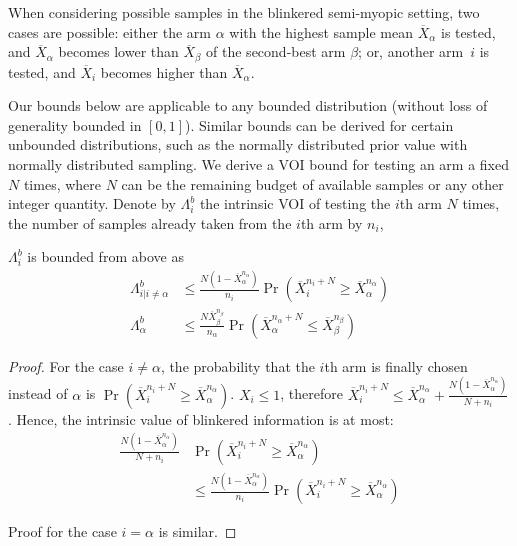 When considering possible samples in the blinkered semi-myopic setting,
two cases are possible: either
	the arm $\alpha$ with the highest sample mean $\overline
  	X_\alpha$ is tested, and $\overline X_\alpha$ becomes lower than
 	$\overline X_\beta$ of the second-best arm $\beta$;
or, 
	another arm~$i$ is tested, and $\overline X_i$ becomes higher
    than $\overline X_\alpha$.


Our bounds below are applicable to any bounded distribution (without loss of generality 
bounded in $[0,1]$). Similar
bounds can be derived for certain unbounded distributions, such as the
normally distributed prior value with normally distributed
sampling.
We derive a VOI bound for testing an arm a fixed $N$ times,
where $N$ can be the remaining budget of available samples or
any other integer quantity.
Denote by  $\Lambda_i^b$ the intrinsic VOI of testing the $i$th arm
$N$ times, the number of
samples already taken from the $i$th arm by $n_i$, 
\begin{thm} $\Lambda_i^b$ is bounded from above as
\begin{align}
\label{eqn:mcts-thm-be}
\Lambda_{i|i\ne\alpha}^b&\le \frac {N(1-\overline X_\alpha^{n_\alpha})} {n_i}\Pr(\overline   X_i^{{n_i}+N}\ge\overline X_\alpha^{n_\alpha})\nonumber\\
\Lambda_\alpha^b&\le \frac {N \overline X_\beta^{n_\beta}} {n_\alpha} \Pr(\overline X_\alpha^{n_\alpha+N}\le\overline X_\beta^{n_\beta})
\end{align}
\label{thm:mcts-be}
\end{thm}
\begin{proof} For the case $i\ne \alpha$, the probability that the
  $i$th arm is finally chosen instead of $\alpha$ is
  $\Pr(\overline X_i^{n_i+N} \ge \overline X_\alpha^{n_\alpha})$. $X_i \le 1$,
  therefore $\overline X_i^{n_i+N}\le \overline
  X_\alpha^{n_\alpha}+\frac {N(1-\overline
  X_\alpha^{n_\alpha})} {N+n_i}$. Hence, the intrinsic value of blinkered
  information is at most: 
\begin{align}
\label{eq:simplistic}
\frac{ N(1-\overline  X_\alpha^{n_\alpha})}
  {N+n_i}&\Pr(\overline X_i^{{n_i}+N}\ge\overline X_\alpha^{n_\alpha})\nonumber \\
&\le\frac{ N(1-\overline  X_\alpha^{n_\alpha})}
{n_i}\Pr(\overline X_i^{{n_i}+N}\ge\overline X_\alpha^{n_\alpha})
\end{align}
    
Proof for the case $i=\alpha$ is similar.
\end{proof}


